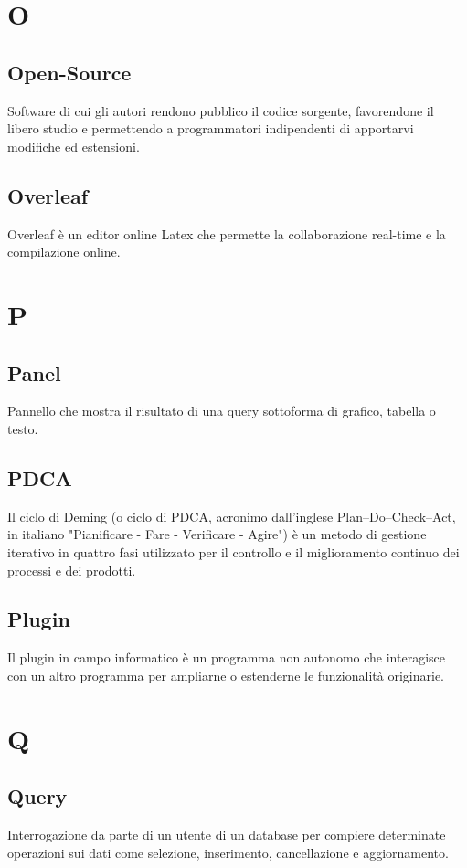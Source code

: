 \section{O}
    \subsection*{Open-Source}
Software di cui gli autori rendono pubblico il codice sorgente, favorendone il libero studio e permettendo a programmatori indipendenti di apportarvi modifiche ed estensioni.
    \subsection*{Overleaf}
Overleaf è un editor online Latex che permette la collaborazione real-time e la compilazione online.
\newpage

\section{P}
    \subsection*{Panel}
Pannello che mostra il risultato di una query sottoforma di grafico, tabella o testo.
    \subsection*{PDCA}
Il ciclo di Deming (o ciclo di PDCA, acronimo dall’inglese Plan–Do–Check–Act, in italiano "Pianificare - Fare - Verificare - Agire") è un metodo di gestione iterativo in quattro fasi utilizzato per il controllo e il miglioramento continuo dei processi e dei prodotti.
    \subsection*{Plugin}
Il plugin in campo informatico è un programma non autonomo che interagisce con un altro programma per ampliarne o estenderne le funzionalità originarie.
\newpage

\section{Q}
    \subsection*{Query}
Interrogazione da parte di un utente di un database per compiere determinate operazioni sui dati come selezione, inserimento, cancellazione e aggiornamento.
\newpage


